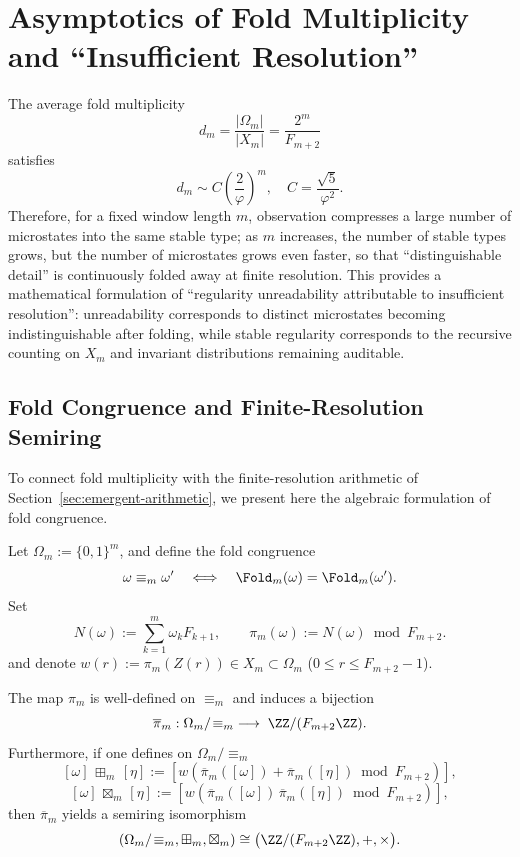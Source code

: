 \section{Asymptotics of Fold Multiplicity and ``Insufficient Resolution''}\label{app:fold-multiplicity}

The average fold multiplicity
\[
d_m=\frac{|\Omega_m|}{|X_m|}=\frac{2^m}{F_{m+2}}
\]
satisfies
\[
d_m\sim C\left(\frac{2}{\varphi}\right)^m,\quad C=\frac{\sqrt5}{\varphi^2}.
\]
Therefore, for a fixed window length $m$, observation compresses a large number of microstates into the same stable type; as $m$ increases, the number of stable types grows, but the number of microstates grows even faster, so that ``distinguishable detail'' is continuously folded away at finite resolution. This provides a mathematical formulation of ``regularity unreadability attributable to insufficient resolution'': unreadability corresponds to distinct microstates becoming indistinguishable after folding, while stable regularity corresponds to the recursive counting on $X_m$ and invariant distributions remaining auditable.

\subsection{Fold Congruence and Finite-Resolution Semiring}
To connect fold multiplicity with the finite-resolution arithmetic of Section~\ref{sec:emergent-arithmetic}, we present here the algebraic formulation of fold congruence.

\begin{definition}
Let $\Omega_m:=\{0,1\}^m$, and define the fold congruence
\[
\omega\equiv_m\omega'\quad\Longleftrightarrow\quad\Fold_m(\omega)=\Fold_m(\omega').
\]
Set
\[
N(\omega):=\sum_{k=1}^m \omega_k F_{k+1},
\qquad
\pi_m(\omega):=N(\omega)\bmod F_{m+2}.
\]
and denote $w(r):=\pi_m(Z(r))\in X_m\subset\Omega_m$ ($0\le r\le F_{m+2}-1$).
\end{definition}

\begin{theorem}
\label{thm:fold-congruence-mod-semirings}
The map $\pi_m$ is well-defined on $\equiv_m$ and induces a bijection
\[
\overline\pi_m:\Omega_m/\!\equiv_m\;\longrightarrow\;\ZZ/(F_{m+2}\ZZ).
\]
Furthermore, if one defines on $\Omega_m/\!\equiv_m$
\[
[\omega]\,\boxplus_m\,[\eta]:=[w(\overline\pi_m([\omega])\!+\!\overline\pi_m([\eta])\bmod F_{m+2})],
\]
\[
[\omega]\,\boxtimes_m\,[\eta]:=[w(\overline\pi_m([\omega])\,\overline\pi_m([\eta])\bmod F_{m+2})],
\]
then $\overline\pi_m$ yields a semiring isomorphism
\[
(\Omega_m/\!\equiv_m,\boxplus_m,\boxtimes_m)\cong\bigl(\ZZ/(F_{m+2}\ZZ),+,\times\bigr).
\]
\end{theorem}

